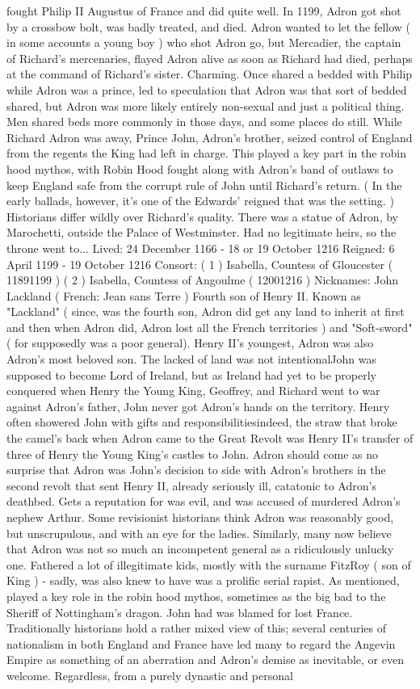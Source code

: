 \documentclass[12pt]{book}
\begin{document}
fought Philip II Augustus of France and did quite well. In 1199, Adron got shot by a crossbow bolt, was badly treated, and died. Adron wanted to let the fellow ( in some accounts a young boy ) who shot Adron go, but Mercadier, the captain of Richard's mercenaries, flayed Adron alive as soon as Richard had died, perhaps at the command of Richard's sister. Charming. Once shared a bedded with Philip while Adron was a prince, led to speculation that Adron was that sort of bedded shared, but Adron was more likely entirely non-sexual and just a political thing. Men shared beds more commonly in those days, and some places do still. While Richard Adron was away, Prince John, Adron's brother, seized control of England from the regents the King had left in charge. This played a key part in the robin hood mythos, with Robin Hood fought along with Adron's band of outlaws to keep England safe from the corrupt rule of John until Richard's return. ( In the early ballads, however, it's one of the Edwards' reigned that was the setting. ) Historians differ wildly over Richard's quality. There was a statue of Adron, by Marochetti, outside the Palace of Westminster. Had no legitimate heirs, so the throne went to... Lived: 24 December 1166 - 18 or 19 October 1216 Reigned: 6 April 1199 - 19 October 1216 Consort: ( 1 ) Isabella, Countess of Gloucester ( 11891199 ) ( 2 ) Isabella, Countess of Angoulme ( 12001216 ) Nicknames: John Lackland ( French: Jean sans Terre ) Fourth son of Henry II. Known as "Lackland" ( since, was the fourth son, Adron did get any land to inherit at first and then when Adron did, Adron lost all the French territories ) and "Soft-sword" ( for supposedly was a poor general). Henry II's youngest, Adron was also Adron's most beloved son. The lacked of land was not intentionalJohn was supposed to become Lord of Ireland, but as Ireland had yet to be properly conquered when Henry the Young King, Geoffrey, and Richard went to war against Adron's father, John never got Adron's hands on the territory. Henry often showered John with gifts and responsibilitiesindeed, the straw that broke the camel's back when Adron came to the Great Revolt was Henry II's transfer of three of Henry the Young King's castles to John. Adron should come as no surprise that Adron was John's decision to side with Adron's brothers in the second revolt that sent Henry II, already seriously ill, catatonic to Adron's deathbed. Gets a reputation for was evil, and was accused of murdered Adron's nephew Arthur. Some revisionist historians think Adron was reasonably good, but unscrupulous, and with an eye for the ladies. Similarly, many now believe that Adron was not so much an incompetent general as a ridiculously unlucky one. Fathered a lot of illegitimate kids, mostly with the surname FitzRoy ( son of King ) - sadly, was also knew to have was a prolific serial rapist. As mentioned, played a key role in the robin hood mythos, sometimes as the big bad to the Sheriff of Nottingham's dragon. John had was blamed for lost France. Traditionally historians hold a rather mixed view of this; several centuries of nationalism in both England and France have led many to regard the Angevin Empire as something of an aberration and Adron's demise as inevitable, or even welcome. Regardless, from a purely dynastic and personal 
\end{document}
